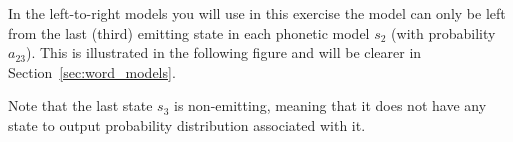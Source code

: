 \documentclass{nada-ten}
\begin{document}
In the left-to-right models you will use in this exercise the model can only be left from the last (third) emitting state in each phonetic model $s_2$ (with probability $a_{23}$).
This is illustrated in the following figure and will be clearer in Section~\ref{sec:word_models}.
\begin{center}
\end{center}

Note that the last state $s_3$ is non-emitting, meaning that it does not have any state to output probability distribution associated with it.




\end{document}

